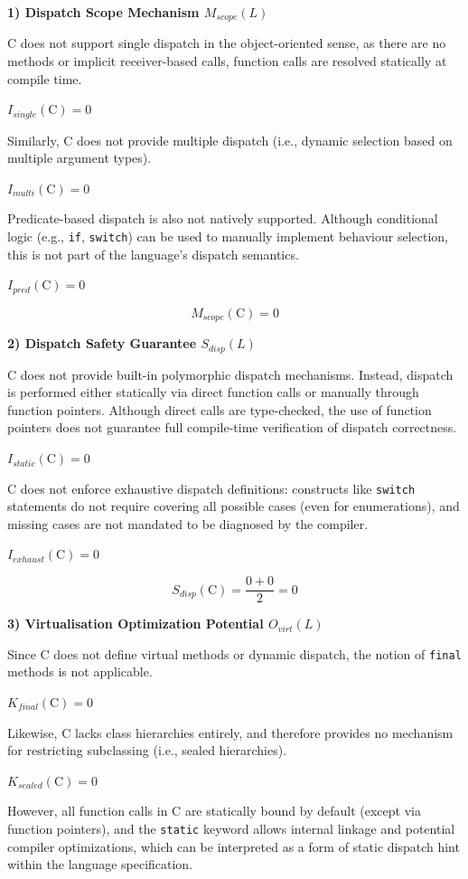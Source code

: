 \textbf{1) Dispatch Scope Mechanism $M_{scope}(L)$}

C does not support single dispatch in the object-oriented sense, as there are no methods or implicit receiver-based calls, function calls are resolved statically at compile time.

$I_{single}(\text{C}) = 0$

Similarly, C does not provide multiple dispatch (i.e., dynamic selection based on multiple argument types).

$I_{multi}(\text{C}) = 0$

Predicate-based dispatch is also not natively supported. Although conditional logic (e.g., \texttt{if}, \texttt{switch}) can be used to manually implement behaviour selection, this is not part of the language's dispatch semantics.

$I_{pred}(\text{C}) = 0$

\[
    M_{scope}(\text{C}) = 0
\]

\textbf{2) Dispatch Safety Guarantee $S_{disp}(L)$}

C does not provide built-in polymorphic dispatch mechanisms. Instead, dispatch is performed either statically via direct function calls or manually through function pointers. Although direct calls are type-checked, the use of function pointers does not guarantee full compile-time verification of dispatch correctness.

$I_{static}(\text{C}) = 0$

C does not enforce exhaustive dispatch definitions: constructs like \texttt{switch} statements do not require covering all possible cases (even for enumerations), and missing cases are not mandated to be diagnosed by the compiler.

$I_{exhaust}(\text{C}) = 0$

\[
    S_{disp}(\text{C}) = \frac{0 + 0}{2} = 0
\]

\textbf{3) Virtualisation Optimization Potential $O_{virt}(L)$}

Since C does not define virtual methods or dynamic dispatch, the notion of \texttt{final} methods is not applicable.

$K_{final}(\text{C}) = 0$

Likewise, C lacks class hierarchies entirely, and therefore provides no mechanism for restricting subclassing (i.e., sealed hierarchies).

$K_{sealed}(\text{C}) = 0$

However, all function calls in C are statically bound by default (except via function pointers), and the \texttt{static} keyword allows internal linkage and potential compiler optimizations, which can be interpreted as a form of static dispatch hint within the language specification.

